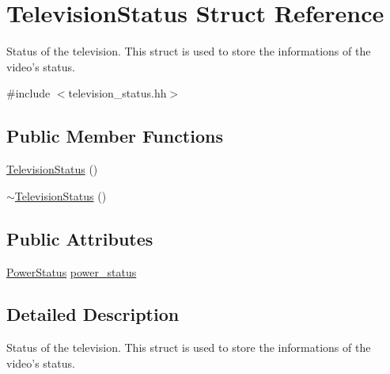 \hypertarget{structTelevisionStatus}{\section{Television\+Status Struct Reference}
\label{structTelevisionStatus}
}


Status of the television. This struct is used to store the informations of the video's status.  




{\ttfamily \#include $<$television\+\_\+status.\+hh$>$}

\subsection*{Public Member Functions}
\begin{DoxyCompactItemize}
\item 
\hyperlink{structTelevisionStatus_adde5868b55df0547cfcc772a7c82af3e}{Television\+Status} ()
\item 
\hyperlink{structTelevisionStatus_a29fc37e00c26001339422e7eb3e7f449}{$\sim$\+Television\+Status} ()
\end{DoxyCompactItemize}
\subsection*{Public Attributes}
\begin{DoxyCompactItemize}
\item 
\hyperlink{television__status_8hh_a65e6bb4d942c22dba9975253b0a1d73f}{Power\+Status} \hyperlink{structTelevisionStatus_a900ca63a3edb937ec4312ff11ea09ea1}{power\+\_\+status}
\end{DoxyCompactItemize}


\subsection{Detailed Description}
Status of the television. This struct is used to store the informations of the video's status. 


